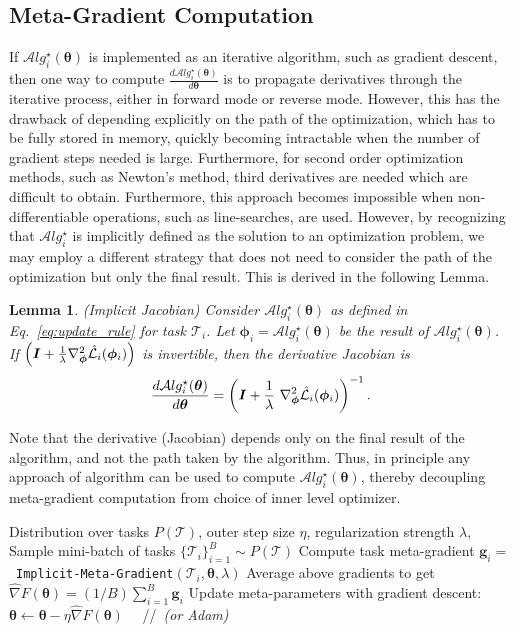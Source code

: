 \documentclass{article} \usepackage[nonatbib, final]{mod_neurips}
\newcommand{\eye}{\boldsymbol{I}}
\newcommand{\task}{\mathcal{T}}
\newtheorem{lemma}{Lemma}
\newcommand{\param}{{\bm{\phi}}}               \newcommand{\paramspace}{\Phi}
\newcommand{\prior}{{\bm{\theta}}}               \newcommand{\priorspace}{\Theta}
\newcommand{\algstar}{\mathcal{A}lg^\star}
\newcommand{\pgrad}{\nabla}
\begin{document}
\subsection{Meta-Gradient Computation}
\label{sec:implicit_jacobian}
If $\algstar_i(\prior)$ is implemented as an iterative algorithm, such as gradient descent, then one way to compute $\frac{d\algstar_i(\prior)}{d\prior}$ is to propagate derivatives through the iterative process, either in forward mode or reverse mode. However, this has the drawback of depending explicitly on the path of the optimization, which has to be fully stored in memory, quickly becoming intractable when the number of gradient steps needed is large. Furthermore, for second order optimization methods, such as Newton's method, third derivatives are needed which are difficult to obtain. Furthermore, this approach becomes impossible when non-differentiable operations, such as line-searches, are used.
However, by recognizing that $\algstar_i$ is implicitly defined as the
solution to an optimization problem, we may employ a different
strategy that does not need to consider the path of the optimization
but only the final result. This is derived in the following Lemma.

\begin{lemma}
\label{lemma:alg_derivative}
(Implicit Jacobian) 
Consider $\algstar_i(\prior)$ as defined in Eq.~\ref{eq:update_rule} for task $\task_i$. Let $\param_i = \algstar_i(\prior)$ be the result of $\algstar_i(\prior)$. If $\left( \eye + \frac{1}{\lambda} \pgrad_\param^2 \fnht_i(\param_i) \right)$ is invertible, then the derivative Jacobian is
\begin{equation}
    \label{eq:alg_derivative}
    \frac{d \algstar_i(\prior)}{d \prior} = \left( \eye + \frac{1}{\lambda}~ \pgrad_\param^2 \fnht_i (\param_i) \right)^{-1}.
\end{equation}
\end{lemma}



Note that the derivative (Jacobian) depends only on the final result of the algorithm, and not the path taken by the algorithm. Thus, in principle any approach of algorithm can be used to compute $\algstar_i(\prior)$, thereby decoupling meta-gradient computation from choice of inner level optimizer.


\begin{algorithm}[t!]
   \caption{Implicit Model-Agnostic Meta-Learning (iMAML)}
   \label{alg:iMAML}
\begin{algorithmic}[1]
 Distribution over tasks $P(\task)$, outer step size $\eta$, regularization strength $\lambda$, 
    \STATE Sample mini-batch of tasks $\{ \task_i \}_{i=1}^B \sim P(\task)$
    \FOR{Each task $\task_i$}
        \STATE Compute task meta-gradient $\bm{g}_i=$~\texttt{Implicit-Meta-Gradient}$(\task_i, \prior, \lambda)$
    \ENDFOR
    \STATE Average above gradients to get $\hat{\pgrad} F(\prior) = (1/B) \sum_{i=1}^B \bm{g}_i$
    \STATE Update meta-parameters with gradient descent: $\prior \leftarrow \prior - \eta \hat{\pgrad} F(\prior)$ \ \ //~\textit{(or Adam)}
\ENDWHILE
\end{algorithmic}
\end{algorithm}
\end{document}
